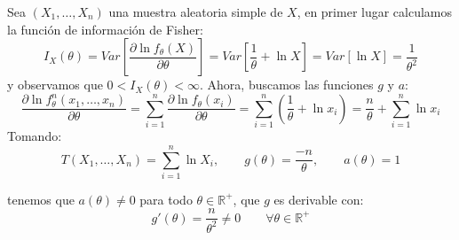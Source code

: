 \begin{ejercicio}
\begin{enumerate}[label=\alph*)]
            Sea $(X_1, \ldots, X_n)$ una muestra aleatoria simple de $X$, en primer lugar calculamos la función de información de Fisher:
            \begin{equation*}
                I_X(\theta) = Var\left[\dfrac{\partial \ln f_\theta(X)}{\partial \theta}\right] = Var\left[\frac{1}{\theta} + \ln X\right] = Var\left[\ln X\right] = \frac{1}{\theta^2}
            \end{equation*}
            y observamos que $0<I_X(\theta) < \infty$. Ahora, buscamos las funciones $g$ y $a$:
            \begin{equation*}
                \dfrac{\partial \ln f_\theta^n(x_1, \ldots, x_n)}{\partial \theta} = \sum_{i=1}^{n} \dfrac{\partial  \ln f_\theta(x_i)}{\partial \theta} = \sum_{i=1}^{n} \left(\frac{1}{\theta}+\ln x_i\right) = \frac{n}{\theta} + \sum_{i=1}^{n}\ln x_i 
            \end{equation*}
            Tomando:
            \begin{equation*}
                T(X_1, \ldots, X_n) = \sum_{i=1}^{n}\ln X_i, \qquad g(\theta) = \frac{-n}{\theta}, \qquad a(\theta) = 1
            \end{equation*}

            tenemos que $a(\theta)\neq 0$ para todo $\theta\in \mathbb{R}^+$, que $g$ es derivable con:
            \begin{equation*}
                g'(\theta) = \frac{n}{\theta^2} \neq 0 \qquad \forall \theta\in \mathbb{R}^+
            \end{equation*}


\end{enumerate}
\end{ejercicio}
